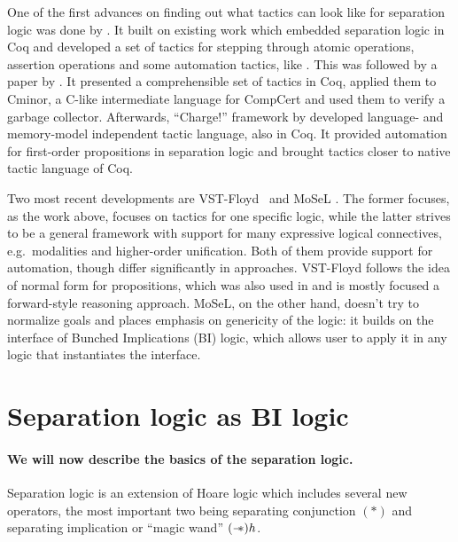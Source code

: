 One of the first advances on finding out what tactics can look like for separation logic was done by \citet{appel2006tactics}.
It built on existing work which embedded separation logic in Coq and developed a set of tactics for stepping through atomic operations, assertion operations and some automation tactics, like .
This was followed by a paper by \citet{mccreightPracticalTacticsSeparation2009}.
It presented a comprehensible set of tactics in Coq, applied them to Cminor, a C-like intermediate language for CompCert and used them to verify a garbage collector.
Afterwards, ``Charge!'' framework by \citet{bengtsonCharge2012} developed language- and memory-model independent tactic language, also in Coq.
It provided automation for first-order propositions in separation logic and brought tactics closer to native tactic language of Coq.

Two most recent developments are VST-Floyd~\cite{caoVSTFloydSeparationLogic2018} and MoSeL \cite{krebbersMoSeLGeneralExtensible2018}.
The former focuses, as the work above, focuses on tactics for one specific logic, while the latter strives to be a general framework with support for many expressive logical connectives, e.g.\ modalities and higher-order unification.
Both of them provide support for automation, though differ significantly in approaches.
VST-Floyd follows the idea of normal form for propositions, which was also used in \cite{bengtsonCharge2012} and is mostly focused a forward-style reasoning approach.
MoSeL, on the other hand, doesn't try to normalize goals and places emphasis on genericity of the logic: it builds on the interface of Bunched Implications (BI) logic, which allows user to apply it in any logic that instantiates the interface.


\section{Separation logic as BI logic}
\label{sec:separation-logic-intro}
\paragraph{We will now describe the basics of the separation logic.}
Separation logic is an extension of Hoare logic which includes several new operators, the most important two being separating conjunction \((*)\) and separating implication or ``magic wand'' \((\mathrel{-\mkern-6mu*})h\).

